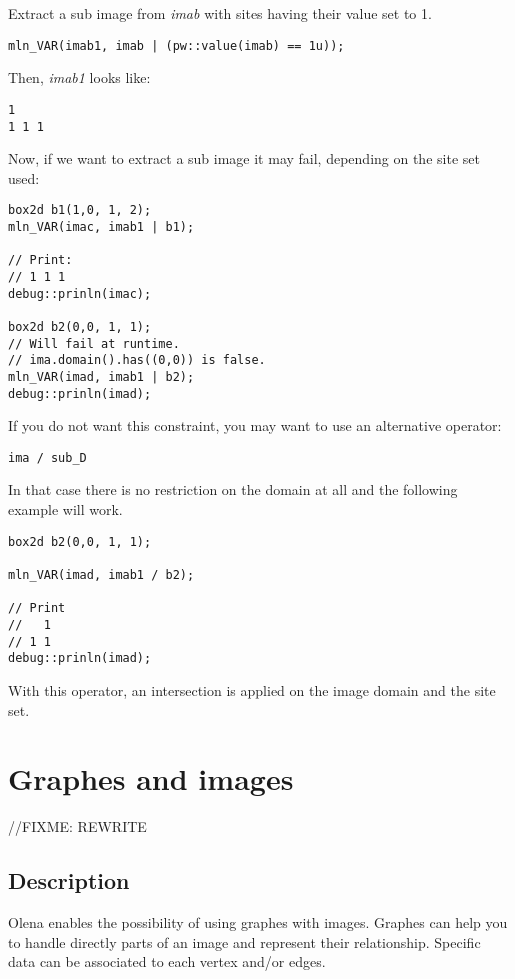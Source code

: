 \documentclass{report}
\begin{document}
Extract a sub image from \textit{imab} with sites having their value set to 1.
\begin{lstlisting}[frame=single]
mln_VAR(imab1, imab | (pw::value(imab) == 1u));
\end{lstlisting}

Then, \textit{imab1} looks like:
\begin{lstlisting}[frame=single]
  1 
1 1 1
\end{lstlisting}

Now, if we want to extract a sub image it may fail, depending on the site set
used:
\begin{lstlisting}[frame=single]
box2d b1(1,0, 1, 2);
mln_VAR(imac, imab1 | b1);

// Print:
// 1 1 1
debug::prinln(imac);

box2d b2(0,0, 1, 1);
// Will fail at runtime.
// ima.domain().has((0,0)) is false.
mln_VAR(imad, imab1 | b2);
debug::prinln(imad);
\end{lstlisting}


If you do not want this constraint, you may want to use an alternative
operator:

\begin{lstlisting}[frame=single]
  ima / sub_D
\end{lstlisting}

In that case there is no restriction on the domain at all and the following example will work.
\begin{lstlisting}[frame=single]
box2d b2(0,0, 1, 1);

mln_VAR(imad, imab1 / b2);

// Print
//   1
// 1 1
debug::prinln(imad);
\end{lstlisting}
With this operator, an intersection is applied on the image domain and the
site set.

\newpage
\clearpage
\chapter{Graphes and images}

//FIXME: REWRITE

\section{Description}
Olena enables the possibility of using graphes with images.
Graphes can help you to handle directly parts of an image and represent their
relationship.
Specific data can be associated to each vertex and/or edges.
\end{document}
